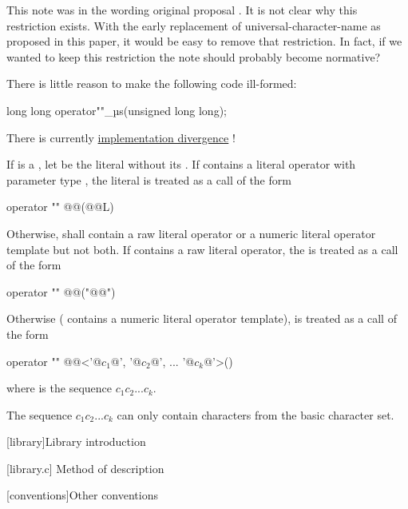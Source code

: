 \documentclass{wg21}
\begin{document}
\begin{quoteblock}
This note was in the wording original proposal .
It is not clear why this restriction exists.
With the early replacement of universal-character-name as proposed in this paper, it would be easy to remove that restriction.
In fact, if we wanted to keep this restriction the note should probably become normative? 

There is little reason to make the following code ill-formed:
\begin{colorblock}
long long operator""_µs(unsigned long long);
\end{colorblock}

There is currently \href{https://godbolt.org/z/sTET3q}{implementation divergence} !
\end{quoteblock}

\pnum
If  is a , let  be the
literal without its . If  contains a literal operator
with parameter type , the literal  is treated as a call of
the form
\begin{codeblock}
    operator "" @@(@@L)
\end{codeblock}
Otherwise,  shall contain a raw literal operator
or a numeric literal operator template but not both.
If  contains a raw literal operator,
the   is treated as a call of the form
\begin{codeblock}
    operator "" @@("@@")
\end{codeblock}
Otherwise ( contains a numeric literal operator template),
 is treated as a call of the form
\begin{codeblock}
    operator "" @@<'@$c_1$@', '@$c_2$@', ... '@$c_k$@'>()
\end{codeblock}
where  is the   sequence $c_1c_2...c_k$.
\begin{note}
    The sequence
    $c_1c_2...c_k$ can only contain characters from the basic  character set.
\end{note}


[library]{Library introduction}

[library.c]{ Method of description}

[conventions]{Other conventions}
\end{document}
